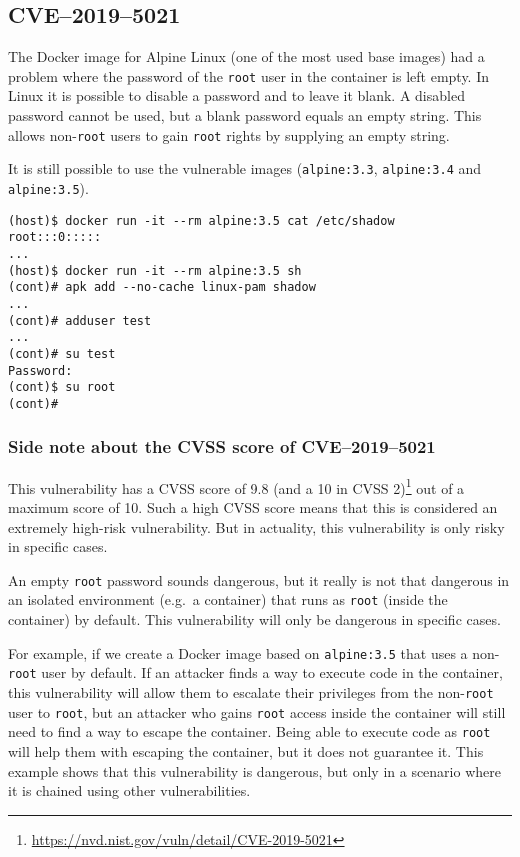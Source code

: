 \subsection{CVE--2019--5021}\label{subsection:CVE-2019-5021}
The Docker image for Alpine Linux (one of the most used base images) had a problem where the password of the \lstinline{root} user in the container is left empty. In Linux it is possible to disable a password and to leave it blank. A disabled password cannot be used, but a blank password equals an empty string. This allows non-\lstinline{root} users to gain \lstinline{root} rights by supplying an empty string.

\medskip

It is still possible to use the vulnerable images (\lstinline{alpine:3.3}, \lstinline{alpine:3.4} and \lstinline{alpine:3.5}).
\begin{lstlisting}[caption={The Docker image of Alpine Linux 3.5 has an empty password.},captionpos=b]
(host)$ docker run -it --rm alpine:3.5 cat /etc/shadow
root:::0:::::
...
(host)$ docker run -it --rm alpine:3.5 sh
(cont)# apk add --no-cache linux-pam shadow
...
(cont)# adduser test
...
(cont)# su test
Password:
(cont)$ su root
(cont)#
\end{lstlisting}

\subsubsection*{Side note about the CVSS score of CVE--2019--5021}

This vulnerability has a CVSS score of 9.8 (and a 10 in CVSS 2)\footnote{\url{https://nvd.nist.gov/vuln/detail/CVE-2019-5021}} out of a maximum score of 10. Such a high CVSS score means that this is considered an extremely high-risk vulnerability. But in actuality, this vulnerability is only risky in specific cases.

An empty \lstinline{root} password sounds dangerous, but it really is not that dangerous in an isolated environment (e.g.\ a container) that runs as \lstinline{root} (inside the container) by default. This vulnerability will only be dangerous in specific cases.

For example, if we create a Docker image based on \lstinline{alpine:3.5} that uses a non-\lstinline{root} user by default. If an attacker finds a way to execute code in the container, this vulnerability will allow them to escalate their privileges from the non-\lstinline{root} user to \lstinline{root}, but an attacker who gains \lstinline{root} access inside the container will still need to find a way to escape the container. Being able to execute code as \lstinline{root} will help them with escaping the container, but it does not guarantee it. This example shows that this vulnerability is dangerous, but only in a scenario where it is chained using other vulnerabilities.
